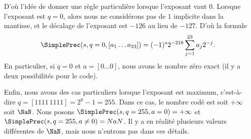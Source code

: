 D'où l'idée de donner une règle particulière lorsque l'exposant vaut \( 0\). Lorsque l'exposant est \( q=0\), alors nous ne considérons pas de \( 1\) implicite dans la mantisse, et le décalage de l'exposant est \( -126\) au lieu de \( -127\). D'où la formule
\begin{equation}
    \SimplePrec(s,q=0,[a_1\ldots a_{23}])=(-1)^s2^{-216}\sum_{j=1}^{23}a_j2^{-j}.
\end{equation}
En particulier, si \( q=0\) et \( a=[0\ldots 0]\), nous avons le nombre zéro exact (il y a deux possibilités pour le code).

Enfin, nous avons des cas particuliers lorsque l'exposant est maximum, c'est-à-dire \( q=[1111\,1111]=2^8-1=255\). Dans ce cas, le nombre codé est soit \( +\infty\) soit \( \NaN\). Nous posons \( \SimplePrec(s,q=255,a=0)=+\infty\) et \( \SimplePrec(s,q=255,a\neq 0)=NaN\). Il y a en réalité plusieurs valeurs différentes de \( \NaN\), mais nous n'entrons pas dans ces détails\cite{ooPOZNooQlGiUN}.

